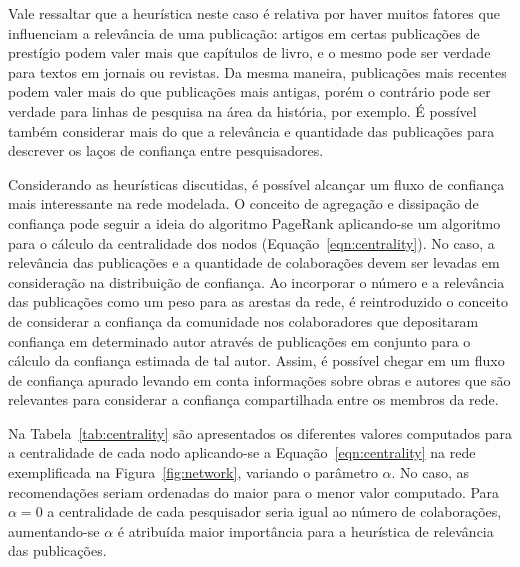 \documentclass[12pt]{article}
\begin{document}
Vale ressaltar que a heurística neste caso é relativa por haver muitos fatores que influenciam a relevância de uma publicação: artigos em certas publicações de prestígio podem valer mais que capítulos de livro, e o mesmo pode ser verdade para textos em jornais ou revistas. Da mesma maneira, publicações mais recentes podem valer mais do que publicações mais antigas, porém o contrário pode ser verdade para linhas de pesquisa na área da história, por exemplo. É possível também considerar mais do que a relevância e quantidade das publicações para descrever os laços de confiança entre pesquisadores. 

Considerando as heurísticas discutidas, é possível alcançar um fluxo de confiança mais interessante na rede modelada. O conceito de agregação e dissipação de confiança pode seguir a ideia do algoritmo PageRank aplicando-se um algoritmo para o cálculo da centralidade dos nodos (Equação~\ref{eqn:centrality}). No caso, a relevância das publicações e a quantidade de colaborações devem ser levadas em consideração na distribuição de confiança. Ao incorporar o número e a relevância das publicações como um peso para as arestas da rede, é reintroduzido o conceito de considerar a confiança da comunidade nos colaboradores que depositaram confiança em determinado autor através de publicações em  conjunto para o cálculo da confiança estimada de tal autor. Assim, é possível chegar em um fluxo de confiança apurado levando em conta informações sobre obras e autores que são relevantes para considerar a confiança compartilhada entre os membros da rede.

Na Tabela~\ref{tab:centrality} são apresentados os diferentes valores computados para a centralidade de cada nodo aplicando-se a Equação~\ref{eqn:centrality} na rede exemplificada na Figura~\ref{fig:network}, variando o parâmetro $\alpha$. No caso, as recomendações seriam ordenadas do maior para o menor valor computado. Para $\alpha = 0$ a centralidade de cada pesquisador seria igual ao número de colaborações, aumentando-se $\alpha$ é atribuída maior importância para a heurística de relevância das publicações.
\end{document}
